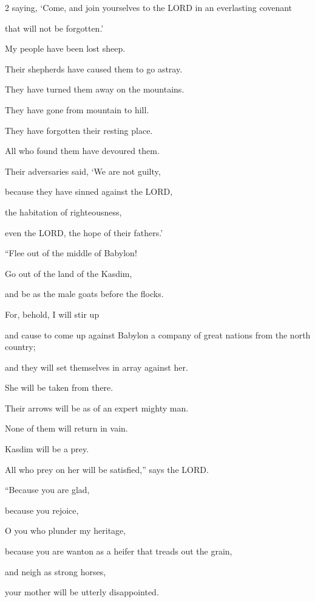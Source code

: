\begin{multicols}{2}
saying, ‘Come, and join yourselves to the LORD in an everlasting covenant

that will not be forgotten.’


\myverse{}My people have been lost sheep.

Their shepherds have caused them to go astray.

They have turned them away on the mountains.

They have gone from mountain to hill.

They have forgotten their resting place.


\myverse{}All who found them have devoured them.

Their adversaries said, ‘We are not guilty,

because they have sinned against the LORD,

the habitation of righteousness,

even the LORD, the hope of their fathers.’

\vspace{\baselineskip}

\myverse{}“Flee out of the middle of Babylon!

Go out of the land of the Kasdim,

and be as the male goats before the flocks.


\myverse{}For, behold, I will stir up

and cause to come up against Babylon a company of great nations from the north
country;

and they will set themselves in array against her.

She will be taken from there.

Their arrows will be as of an expert mighty man.

None of them will return in vain.


\myverse{}Kasdim will be a prey.

All who prey on her will be satisfied,” says the LORD.

\vspace{\baselineskip}

\myverse{}“Because you are glad,

because you rejoice,

O you who plunder my heritage,

because you are wanton as a heifer that treads out the grain,

and neigh as strong horses,


\myverse{}your mother will be utterly disappointed.


\end{multicols}
